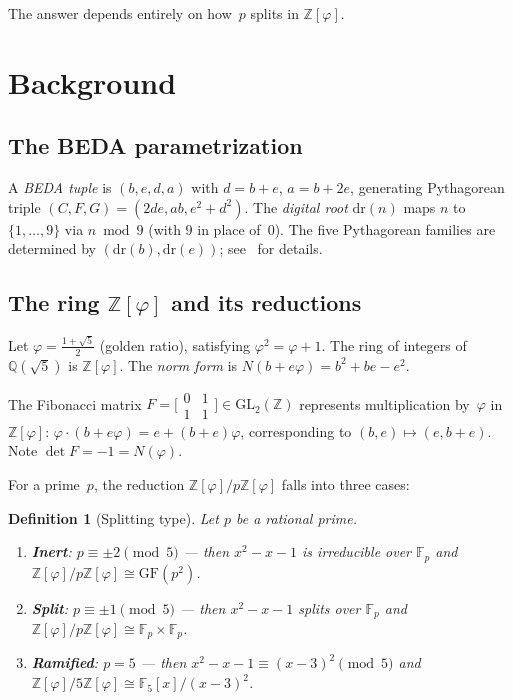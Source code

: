 \documentclass[12pt]{article}
\newtheorem{definition}{Definition}
\begin{document}
The answer depends entirely on how~$p$ splits in $\mathbb{Z}[\varphi]$.

\section{Background}

\subsection{The BEDA parametrization}

A \emph{BEDA tuple} is $(b,e,d,a)$ with $d=b+e$, $a=b+2e$, generating Pythagorean
triple $(C,F,G)=(2de,ab,e^2+d^2)$.  The \emph{digital root} $\mathrm{dr}(n)$ maps $n$
to $\{1,\ldots,9\}$ via $n\bmod 9$ (with $9$ in place of~$0$).  The five Pythagorean
families are determined by $(\mathrm{dr}(b),\mathrm{dr}(e))$; see~\cite{pyth-families} for details.

\subsection{The ring $\mathbb{Z}[\varphi]$ and its reductions}

Let $\varphi=\frac{1+\sqrt{5}}{2}$ (golden ratio), satisfying $\varphi^2=\varphi+1$.
The ring of integers of $\mathbb{Q}(\sqrt{5})$ is $\mathbb{Z}[\varphi]$.
The \emph{norm form} is $N(b+e\varphi)=b^2+be-e^2$.

The Fibonacci matrix $F=\bigl[\begin{smallmatrix}0&1\\1&1\end{smallmatrix}\bigr]\in\mathrm{GL}_2(\mathbb{Z})$
represents multiplication by~$\varphi$ in~$\mathbb{Z}[\varphi]$: $\varphi\cdot(b+e\varphi)=e+(b+e)\varphi$,
corresponding to $(b,e)\mapsto(e,b+e)$.  Note $\det F=-1=N(\varphi)$.

For a prime~$p$, the reduction $\mathbb{Z}[\varphi]/p\mathbb{Z}[\varphi]$ falls into three cases:

\begin{definition}[Splitting type]
Let $p$ be a rational prime.
\begin{enumerate}
\item \textbf{Inert}: $p\equiv\pm2\pmod5$ — then $x^2-x-1$ is irreducible over $\mathbb{F}_p$
  and $\mathbb{Z}[\varphi]/p\mathbb{Z}[\varphi]\cong\mathrm{GF}(p^2)$.
\item \textbf{Split}: $p\equiv\pm1\pmod5$ — then $x^2-x-1$ splits over $\mathbb{F}_p$
  and $\mathbb{Z}[\varphi]/p\mathbb{Z}[\varphi]\cong\mathbb{F}_p\times\mathbb{F}_p$.
\item \textbf{Ramified}: $p=5$ — then $x^2-x-1\equiv(x-3)^2\pmod5$ and
  $\mathbb{Z}[\varphi]/5\mathbb{Z}[\varphi]\cong\mathbb{F}_5[x]/(x-3)^2$.
\end{enumerate}
\end{definition}
\end{document}
